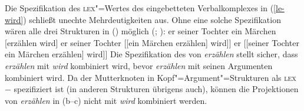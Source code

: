 Die Spezifikation des \textsc{lex}"=Wertes des eingebetteten Verbalkomplexes in (\ref{le-wird})
schließt unechte Mehrdeutigkeiten aus.
Ohne eine solche Spezifikation wären alle drei Strukturen in () möglich (\citealp[]{Pollard90a};
\citealp{HN94b}):
\eal
\ex er seiner Tochter  ein Märchen [erzählen wird]
\ex er seiner Tochter [[ein Märchen erzählen] wird]]\label{pvp-ein-maerchen-erzaehlen}
\ex er [[seiner Tochter ein Märchen erzählen] wird]]
\zl
Die Spezifikation des \lexwes von \emph{erzählen} stellt sicher, dass \emph{erzählen} mit \emph{wird} kombiniert wird,
bevor \emph{erzählen} mit seinen Argumenten kombiniert wird. Da der Mutterknoten in
Kopf"=Argument"=Strukturen als \textsc{lex}$-$ spezifiziert ist (in anderen Strukturen übrigens auch), 
können die Projektionen
von \emph{erzählen} in (b--c) nicht mit \emph{wird} kombiniert werden.

